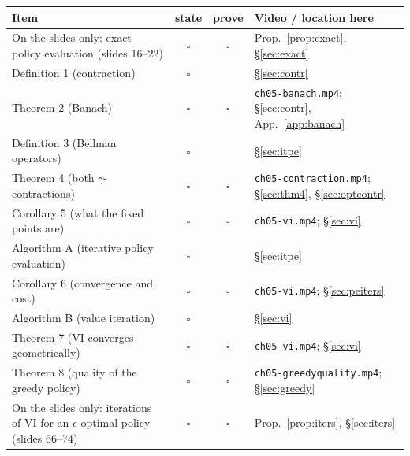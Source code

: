 \documentclass[11pt,a4paper]{article}
\theoremstyle{plain}
\theoremstyle{definition}
\theoremstyle{remark}
\begin{document}
\begin{center}
\small
\renewcommand{\arraystretch}{1.2}
\begin{tabular}{@{}>{\raggedright\arraybackslash}p{6.0cm}cc>{\raggedright\arraybackslash}p{4.9cm}@{}}
\toprule
\textbf{Item} & \textbf{state} & \textbf{prove} & \textbf{Video / location here}\\
\midrule
On the slides only: exact policy evaluation (slides 16--22) & $\square$ & $\square$ & Prop.~\ref{prop:exact}, \S\ref{sec:exact}\\
Definition 1 (contraction) & $\square$ & & \S\ref{sec:contr}\\
Theorem 2 (Banach) & $\square$ & $\square$ & \texttt{ch05-banach.mp4}; \S\ref{sec:contr}, App.~\ref{app:banach}\\
Definition 3 (Bellman operators) & $\square$ & & \S\ref{sec:itpe}\\
Theorem 4 (both $\gamma$-contractions) & $\square$ & $\square$ & \texttt{ch05-contraction.mp4}; \S\ref{sec:thm4}, \S\ref{sec:optcontr}\\
Corollary 5 (what the fixed points are) & $\square$ & $\square$ & \texttt{ch05-vi.mp4}; \S\ref{sec:vi}\\
Algorithm A (iterative policy evaluation) & $\square$ & & \S\ref{sec:itpe}\\
Corollary 6 (convergence and cost) & $\square$ & $\square$ & \texttt{ch05-vi.mp4}; \S\ref{sec:peiters}\\
Algorithm B (value iteration) & $\square$ & & \S\ref{sec:vi}\\
Theorem 7 (VI converges geometrically) & $\square$ & $\square$ & \texttt{ch05-vi.mp4}; \S\ref{sec:vi}\\
Theorem 8 (quality of the greedy policy) & $\square$ & $\square$ & \texttt{ch05-greedyquality.mp4}; \S\ref{sec:greedy}\\
On the slides only: iterations of VI for an $\epsilon$-optimal policy (slides 66--74) & $\square$ & $\square$ & Prop.~\ref{prop:iters}, \S\ref{sec:iters}\\
\bottomrule
\end{tabular}
\end{center}
\end{document}
